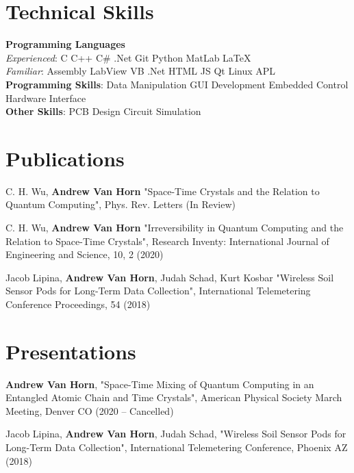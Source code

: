 \documentclass[letterpaper,11pt]{article}
\begin{document}
%

\section{Technical Skills}
 \begin{itemize}[leftmargin=0.15in, label={}]
    \small{\item{
     \textbf{Programming Languages}\\
     \quad \textit{Experienced}{: C \textbullet{}  C++ \textbullet{} C\# .Net \textbullet{}	Git \textbullet{} Python \textbullet{} MatLab} \textbullet{} \LaTeX\ \\
     \quad \textit{Familiar}{: Assembly \textbullet{} LabView \textbullet{} VB .Net \textbullet{} HTML \textbullet{} JS \textbullet{} Qt \textbullet{} Linux \textbullet{} APL} \\
     \textbf{Programming Skills}{: Data Manipulation \textbullet{} GUI Development \textbullet{} Embedded Control \textbullet{} Hardware Interface} \\
     \textbf{Other Skills}{: PCB Design \textbullet{} Circuit Simulation} \\
    }}
 \end{itemize}

\section{Publications}
\begin{itemize}[leftmargin=0.15in, label={}]
	\small{\item{
			C. H. Wu, \textbf{Andrew Van Horn} "Space-Time Crystals and the Relation to Quantum Computing", Phys. Rev. Letters (In Review)
	}}
	\small{\item{
		C. H. Wu, \textbf{Andrew Van Horn} "Irreversibility in Quantum Computing and the Relation to Space-Time Crystals", Research Inventy: International Journal of Engineering and Science, 10, 2 (2020)
	}}
	\small{\item{
			Jacob Lipina, \textbf{Andrew Van Horn}, Judah Schad, Kurt Kosbar "Wireless Soil Sensor Pods for Long-Term Data Collection", International Telemetering Conference Proceedings, 54 (2018)
	}}
\end{itemize}	

\section{Presentations}
\begin{itemize}[leftmargin=0.15in, label={}]
	\small{\item{
			\textbf{Andrew Van Horn}, "Space-Time Mixing of Quantum Computing in an Entangled Atomic Chain and Time Crystals", American Physical Society March Meeting, Denver CO (2020 -- Cancelled)
	}}
	\small{\item{
			Jacob Lipina, \textbf{Andrew Van Horn}, Judah Schad, "Wireless Soil Sensor Pods for Long-Term Data Collection", International Telemetering Conference, Phoenix AZ (2018)
	}}
\end{itemize}
\end{document}
